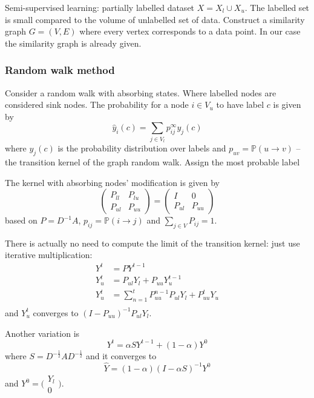 \documentclass[a4paper]{article}
\newcommand{\pr}{\mathbb{P}}
\begin{document}
Semi-supervised learning: partially labelled dataset $X = X_l\cup X_u$. The labelled
set is small compared to the volume of unlabelled set of data. Construct a similarity
graph $G=(V,E)$ where every vertex corresponds to a data point. In our case the
similarity graph is already given.

\subsubsection{Random walk method} %
\label{ssub:random_walk_method}

Consider a random walk with absorbing states. Where labelled nodes are considered
sink nodes. The probability for a node $i\in V_u$ to have label $c$ is given by
\[\hat{y}_i(c) = \sum_{j\in V_l} p^\infty_{ij} y_j(c)\]
where $y_j(c)$ is the probability distribution over labels and $p_{uv} = \pr(u\to v)$
-- the transition kernel of the graph random walk. Assign the most probable label

The kernel with absorbing nodes' modification is given by
\[
  \begin{pmatrix} P_{ll} & P_{lu}\\ P_{ul} & P_{uu} \end{pmatrix}
= \begin{pmatrix} I & 0\\ P_{ul} & P_{uu} \end{pmatrix}
\]
based on $P = D^{-1} A$, $p_{ij} = \pr(i\to j)$ and $\sum_{j\in V} P_{ij} = 1$.

There is actually no need to compute the limit of the transition kernel: just use
iterative multiplication:
\begin{align*}
	Y^t &= P Y^{t-1}\\
	Y^t_u &= P_{ul} Y_l + P_{uu} Y^{t-1}_u\\
	Y^t_u &= \sum_{n=1}^t P_{uu}^{n-1} P_{ul} Y_l + P_{uu}^t Y_u\\
\end{align*}
and $Y^t_u$ converges to $(I-P_{uu})^{-1}P_{ul} Y_l$.

Another variation is
\[
Y^t = \alpha S Y^{t-1} + (1-\alpha)Y^0
\]
where $S = D^{-\frac{1}{2}}AD^{-\frac{1}{2}}$ and it converges to
\[\hat{Y} = (1-\alpha) (I - \alpha S)^{-1} Y^0\]
and $Y^0 = \bigl(\begin{smallmatrix} Y_l\\0 \end{smallmatrix}\bigr)$.

\end{document}
